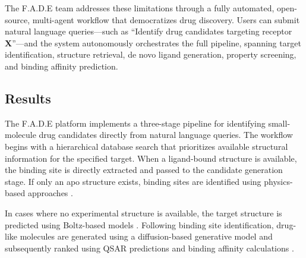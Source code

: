 The F.A.D.E team addresses these limitations through a fully automated, open-source, multi-agent workflow that democratizes drug discovery. Users can submit natural language queries—such as “Identify drug candidates targeting receptor \textbf{X}”—and the system autonomously orchestrates the full pipeline, spanning target identification, structure retrieval, de novo ligand generation, property screening, and binding affinity prediction.


\subsection*{Results}

The F.A.D.E platform implements a three-stage pipeline for identifying small-molecule drug candidates directly from natural language queries. The workflow begins with a hierarchical database search that prioritizes available structural information for the specified target. When a ligand-bound structure is available, the binding site is directly extracted and passed to the candidate generation stage. If only an apo structure exists, binding sites are identified using physics-based approaches \cite{leguilluox2009}.  

In cases where no experimental structure is available, the target structure is predicted using Boltz-based models \cite{passaro2025boltz2, wohlwend2024boltz1}. Following binding site identification, drug-like molecules are generated using a diffusion-based generative model \cite{arne2024} and subsequently ranked using QSAR predictions and binding affinity calculations \cite{passaro2025boltz2, wohlwend2024boltz1}.  

